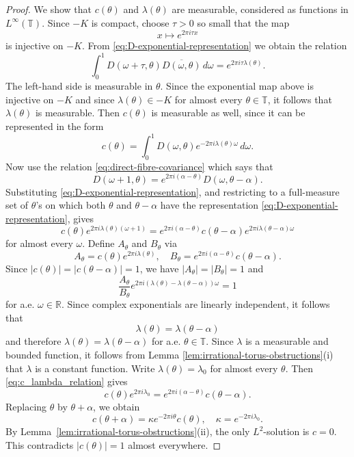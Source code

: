 \documentclass[reqno,a4paper,12pt]{amsart}
\numberwithin{equation}{section}
\def\R{{\mathbb R}}
\def\T{{\mathbb T}}
\newcommand\1{\mathds{1}}
\begin{document}
\begin{proof}
We show that $c(\theta)$ and $\lambda(\theta)$ are measurable, considered as functions in $L^\infty(\T)$. Since $-K$ is compact, choose $\tau>0$ so
small that the map
$$
x \mapsto e^{2\pi i\tau x}
$$
is injective on $-K$. From \eqref{eq:D-exponential-representation} we obtain the relation
$$
\int_0^1D(\omega+\tau,\theta)\overline{D(\omega,\theta)}\,d\omega
=
e^{2\pi i\tau\lambda(\theta)}.
$$
The left-hand side is measurable in $\theta$. Since the exponential map above
is injective on $-K$ and since $\lambda(\theta) \in -K$ for almost every $\theta \in \T$, it follows that $\lambda(\theta)$ is measurable. Then
$c(\theta)$ is measurable as well, since it can be represented in the form
$$
c(\theta)=\int_0^1D(\omega,\theta)e^{-2\pi i\lambda(\theta)\omega}\,d\omega.
$$
Now use the relation \eqref{eq:direct-fibre-covariance} which says that
$$
D(\omega+1,\theta)
=
e^{2\pi i(\alpha-\theta)}D(\omega,\theta-\alpha).
$$
Substituting \eqref{eq:D-exponential-representation}, and restricting to a
full-measure set of $\theta$'s on which both $\theta$ and $\theta-\alpha$ have
the representation \eqref{eq:D-exponential-representation}, gives
\begin{equation}\label{eq:c_lambda_relation}
c(\theta)e^{2\pi i\lambda(\theta)(\omega+1)}
=
e^{2\pi i(\alpha-\theta)}
c(\theta-\alpha)e^{2\pi i\lambda(\theta-\alpha)\omega}
\end{equation}
for almost every $\omega$. Define $A_\theta$ and $B_\theta$ via
$$
A_\theta = c(\theta)e^{2\pi i\lambda(\theta)}, \quad B_\theta = e^{2\pi i(\alpha-\theta)}c(\theta-\alpha).
$$
Since $|c(\theta)| = |c(\theta-\alpha)| = 1$, we have $|A_\theta| = |B_\theta| = 1$ and
$$
\frac{A_\theta}{B_\theta} e^{2\pi i (\lambda(\theta) -\lambda(\theta-\alpha) ) \omega} = 1
$$
for a.e. $\omega \in \R$. Since complex exponentials are linearly independent, it follows that
$$
\lambda(\theta) = \lambda(\theta-\alpha)
$$
and therefore $\lambda(\theta)=\lambda(\theta-\alpha)$ for a.e. $\theta \in \T$. Since $\lambda$ is a measurable and bounded function, it follows from Lemma \ref{lem:irrational-torus-obstructions}(i) that $\lambda$ is a constant function. Write $\lambda(\theta)=\lambda_0$ for almost every $\theta$. Then \eqref{eq:c_lambda_relation} gives
$$
c(\theta)e^{2\pi i\lambda_0}
=
e^{2\pi i(\alpha-\theta)}c(\theta-\alpha).
$$
Replacing $\theta$ by $\theta+\alpha$, we obtain
$$
c(\theta+\alpha)
=
 \kappa e^{-2\pi i\theta}c(\theta), \quad \kappa = e^{-2\pi i\lambda_0}.
$$
By Lemma~\ref{lem:irrational-torus-obstructions}(ii), the only $L^2$-solution
is $c=0$. This contradicts $|c(\theta)|=1$ almost everywhere.
\end{proof}
\end{document}
